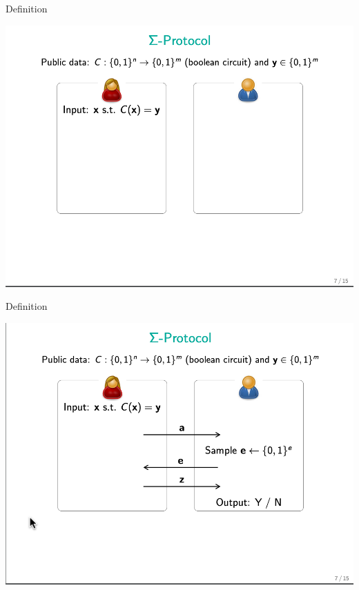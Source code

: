 \documentclass{beamer}
\begin{document}
\begin{frame}{Definition}
	\begin{minipage}{0.42\linewidth}
		\includegraphics[scale=0.4]{f2.png}
	\end{minipage}
\end{frame}

\begin{frame}{Definition}
	\begin{minipage}{0.42\linewidth}
		\includegraphics[scale=0.4]{f3.png}
	\end{minipage}
\end{frame}
\end{document}
